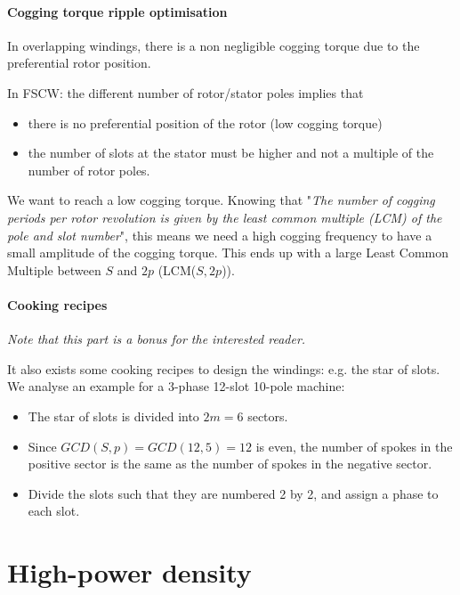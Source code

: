 \paragraph{Cogging torque ripple optimisation}

In overlapping windings, there is a non negligible cogging torque due to the preferential rotor position.

In FSCW: the different number of rotor/stator poles implies that
\begin{itemize}
    \item there is no preferential position of the rotor (low cogging torque)
    \item the number of slots at the stator must be higher and not a multiple of the number of rotor poles.
\end{itemize}

We want to reach a low cogging torque.
Knowing that "\textit{The number of cogging periods per rotor
revolution is given by the least common
multiple (LCM) of the pole and slot number}", this means we need a high cogging frequency to have a small amplitude of the cogging torque. This ends up with a large Least Common Multiple between $S$ and $2p$ (LCM($S,2p$)).

\paragraph{Cooking recipes}

\textit{Note that this part is a bonus for the interested reader.}

It also exists some cooking recipes to design the windings: e.g. the star of slots. We analyse an example for a 3-phase 12-slot 10-pole machine:



\begin{itemize}
    \item The star of slots is divided into $2m = 6$ sectors.
    \item Since $GCD(S,p) = GCD(12,5) = 12$ is even, the number of spokes in the positive sector is the same as the number of spokes in the negative sector.
    \item Divide the slots such that they are numbered 2 by 2, and assign a phase to each slot.
\end{itemize}

\section{High-power density}

